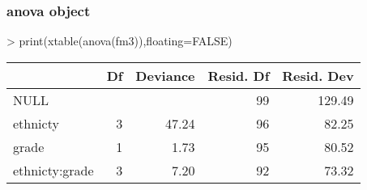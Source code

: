 \documentclass[letterpaper]{article}
\begin{document}
\subsubsection{anova object}
\begin{Schunk}
\begin{Sinput}
> print(xtable(anova(fm3)),floating=FALSE)
\end{Sinput}
% latex table generated in R 3.1.1 by xtable 1.7-3 package
% 
\begin{tabular}{lrrrr}
  \hline
 & Df & Deviance & Resid. Df & Resid. Dev \\ 
  \hline
NULL &  &  & 99 & 129.49 \\ 
  ethnicty & 3 & 47.24 & 96 & 82.25 \\ 
  grade & 1 & 1.73 & 95 & 80.52 \\ 
  ethnicty:grade & 3 & 7.20 & 92 & 73.32 \\ 
   \hline
\end{tabular}\end{Schunk}
\end{document}
